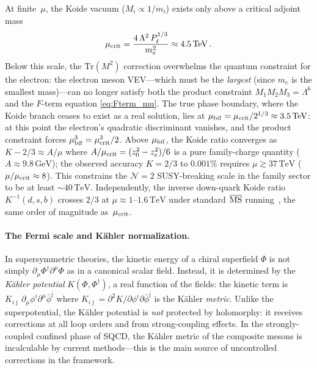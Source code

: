 \documentclass[12pt,a4paper]{article}
\newcommand{\Tr}{\mathrm{Tr}}
\newcommand{\GeV}{\,\mathrm{GeV}}
\newcommand{\TeV}{\,\mathrm{TeV}}
\begin{document}
At finite~$\mu$, the Koide vacuum ($M_i \propto 1/m_i$)
exists only above a critical adjoint mass
\begin{equation}
  \mu_{\rm crit} = \frac{4\,\Lambda^2\,P_\ell^{1/3}}{m_e^2}
  \approx 4.5\TeV\,.
  \label{eq:mucrit}
\end{equation}
Below this scale, the $\Tr(M^2)$ correction overwhelms
the quantum constraint for the electron: the electron meson
VEV---which must be the \emph{largest} (since $m_e$ is the smallest
mass)---can no longer satisfy both the product constraint
$M_1 M_2 M_3 = \Lambda^6$ and the $F$-term equation
\eqref{eq:Fterm_mu}.
The true phase boundary, where the Koide branch ceases to
exist as a real solution, lies at
$\mu_{\rm bif} = \mu_{\rm crit}/2^{1/3} \approx 3.5\TeV$:
at this point the electron's quadratic discriminant vanishes, and the
product constraint forces $\mu^3_{\rm bif} = \mu^3_{\rm crit}/2$.
Above $\mu_{\rm bif}$, the Koide ratio converges as
$K - 2/3 \approx A/\mu$ where $A/\mu_{\rm crit} = (z_0^2 - z_e^2)/6$
is a pure family-charge quantity ($A \approx 9.8\GeV$);
the observed accuracy $K = 2/3$ to $0.001\%$ requires $\mu \gtrsim 37\TeV$
($\mu/\mu_{\rm crit} \approx 8$).
This constrains the $\mathcal{N}=2$ SUSY-breaking
scale in the family sector to be at least $\sim\!40\TeV$.
Independently, the inverse down-quark Koide ratio
$K^{-1}(d,s,b)$ crosses $2/3$ at $\mu \approx 1$--$1.6\TeV$
under standard $\overline{\rm MS}$ running~\cite{AntuschHinzeSaad:2025},
the same order of magnitude as~$\mu_{\rm crit}$.

\paragraph{The Fermi scale and K\"ahler normalization.}
In supersymmetric theories, the kinetic energy of a chiral
superfield $\Phi$ is not simply $\partial_\mu\Phi^\dagger
\partial^\mu\Phi$ as in a canonical scalar field. Instead, it is
determined by the \emph{K\"ahler potential} $K(\Phi,\Phi^\dagger)$,
a real function of the fields: the kinetic term is
$K_{i\bar\jmath}\,\partial_\mu\phi^i\partial^\mu\bar\phi^{\bar\jmath}$
where $K_{i\bar\jmath} = \partial^2 K/\partial\phi^i\partial
\bar\phi^{\bar\jmath}$ is the K\"ahler \emph{metric}.
Unlike the superpotential, the K\"ahler potential is \emph{not}
protected by holomorphy: it receives corrections at all loop orders
and from strong-coupling effects. In the strongly-coupled confined
phase of SQCD, the K\"ahler metric of the composite mesons is
incalculable by current methods---this is the main source of
uncontrolled corrections in the framework.
\end{document}
